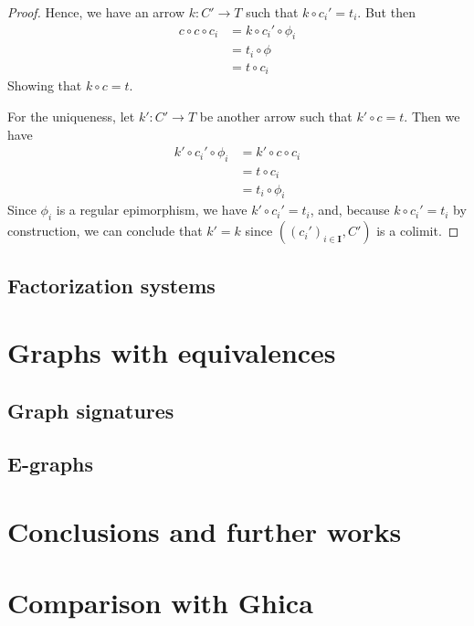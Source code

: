 \documentclass[runningheads,envcountsect]{llncs}
\newcommand{\cat}[1]{\ensuremath{\mathbf{#1}}}
\theoremstyle{plain}
\theoremstyle{definition}
\begin{document}
\begin{proof}
    Hence, we have an arrow $k: C' \to T$ such that $k \circ c_i' = t_i$. But then
    \begin{align*}
        c \circ c \circ c_i &= k \circ c_i' \circ \phi_i \\
                            &= t_i \circ \phi \\
                            &= t \circ c_i
    \end{align*}
    Showing that $k \circ c = t$.

    For the uniqueness, let $k': C' \to T$ be another arrow such that $k' \circ c = t$. Then we have
    \begin{align*}
        k' \circ c_i' \circ \phi_i &= k' \circ c \circ c_i \\
                                   &= t \circ c_i \\
                                   &= t_i \circ \phi_i
    \end{align*}    
    Since $\phi_i$ is a regular epimorphism, we have $k' \circ c_i' = t_i$, and, because $k \circ c_i' = t_i$ by construction, we can conclude that $k'=k$ since $((c_i')_{i \in \cat I}, C')$ is a colimit.
\end{proof}

\subsection{Factorization systems}


\section{Graphs with equivalences}

\subsection{Graph signatures}




\subsection{E-graphs}


\section{Conclusions and further works}


\appendix
\section{Comparison with Ghica}
\end{document}
